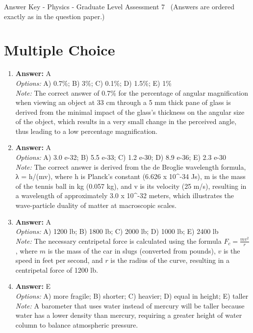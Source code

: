 \documentclass[12pt]{article}
\begin{document}
\begin{center}
Answer Key - Physics - Graduate Level Assessment 7 \
\small (Answers are ordered exactly as in the question paper.)
\end{center}

\section*{Multiple Choice}
\begin{enumerate}[label=\arabic*.]
\item \textbf{Answer:} A
\\ \textit{Options:} A) 0.7\%; B) 3\%; C) 0.1\%; D) 1.5\%; E) 1\%
\\ \textit{Note:} The correct answer of 0.7\% for the percentage of angular magnification when viewing an object at 33 cm through a 5 mm thick pane of glass is derived from the minimal impact of the glass's thickness on the angular size of the object, which results in a very small change in the perceived angle, thus leading to a low percentage magnification.
\item \textbf{Answer:} A
\\ \textit{Options:} A) 3.0 e-32; B) 5.5 e-33; C) 1.2 e-30; D) 8.9 e-36; E) 2.3 e-30
\\ \textit{Note:} The correct answer is derived from the de Broglie wavelength formula, λ = h/(mv), where h is Planck's constant (6.626 x 10^-34 Js), m is the mass of the tennis ball in kg (0.057 kg), and v is its velocity (25 m/s), resulting in a wavelength of approximately 3.0 x 10^-32 meters, which illustrates the wave-particle duality of matter at macroscopic scales.
\item \textbf{Answer:} A
\\ \textit{Options:} A) 1200 lb; B) 1800 lb; C) 2000 lb; D) 1000 lb; E) 2400 lb
\\ \textit{Note:} The necessary centripetal force is calculated using the formula \( F_c = \frac{mv^2}{r} \), where \( m \) is the mass of the car in slugs (converted from pounds), \( v \) is the speed in feet per second, and \( r \) is the radius of the curve, resulting in a centripetal force of 1200 lb.
\item \textbf{Answer:} E
\\ \textit{Options:} A) more fragile; B) shorter; C) heavier; D) equal in height; E) taller
\\ \textit{Note:} A barometer that uses water instead of mercury will be taller because water has a lower density than mercury, requiring a greater height of water column to balance atmospheric pressure.

\end{enumerate}
\end{document}
